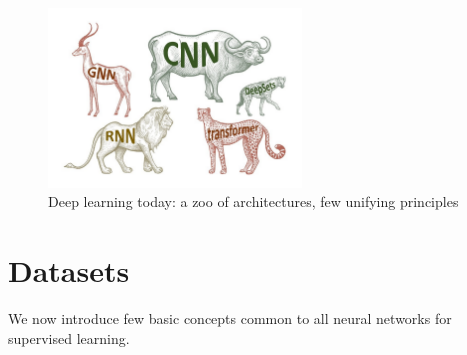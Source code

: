 \documentclass[12pt,a4paper]{report}
\theoremstyle{definition}
\begin{document}
\begin{figure}[t]
    \centering
    \includegraphics[width=0.6\textwidth]{./Images/NN_zoo}
    \caption{Deep learning today: a zoo of architectures, few unifying principles}
    \label{fig:NN_zoo}
\end{figure}

\section{Datasets}
\label{sec:dataset}

We now introduce few basic concepts common to all neural networks for supervised learning.
\end{document}
